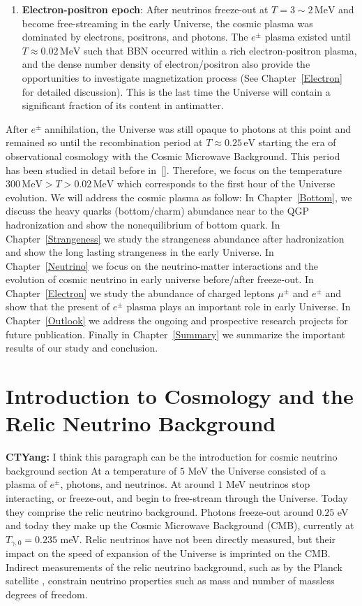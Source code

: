 \begin{enumerate}
    \item \textbf{Electron-positron epoch}: After neutrinos freeze-out at $T=3\sim2\,\mathrm{MeV}$ and become free-streaming in the early Universe, the cosmic plasma was dominated by electrons, positrons, and photons. The $e^\pm$ plasma existed until $T\approx0.02\,\mathrm{MeV}$ such that BBN occurred within a rich electron-positron plasma, and the dense number density of electron/positron also provide the opportunities to investigate magnetization process (See Chapter~\ref{Electron} for detailed discussion). This is the last time the Universe will contain a significant fraction of its content in antimatter.
\end{enumerate}
After $e^\pm$ annihilation, the Universe was still opaque to photons at this point and remained so until the recombination period at $T\approx0.25\,\mathrm{eV}$ starting the era of observational cosmology with the Cosmic Microwave Background. This period has been studied in detail before in~[\cite{Planck:2018vyg}]. Therefore, we focus on the temperature $300\,\mathrm{MeV}>T>0.02\,\mathrm{MeV}$ which corresponds to the first hour of the Universe evolution. We will address the cosmic plasma as follow: In Chapter~\ref{Bottom}, we discuss the heavy quarks (bottom/charm) abundance near to the QGP hadronization and show the nonequilibrium of bottom quark.  In Chapter~\ref{Strangeness} we study the strangeness abundance after hadronization and show the long lasting strangeness in the early Universe. In Chapter~\ref{Neutrino} we focus on the neutrino-matter interactions and the evolution of cosmic neutrino in early universe before/after freeze-out. In Chapter~\ref{Electron} we study the abundance of charged leptons $\mu^\pm$ and $e^\pm$ and show that the present of $e^\pm$ plasma plays an important role in early Universe. In Chapter~\ref{Outlook} we address the ongoing and prospective research projects for future publication.
Finally in Chapter~\ref{Summary} we summarize the important results of our study and conclusion.

\section{Introduction to Cosmology and the Relic Neutrino Background}\label{ch:intro}
{\color{blue}\textbf{CTYang:} I think this paragraph can be the introduction for cosmic neutrino background section}
At a temperature of $5$ MeV the Universe consisted of a plasma of $e^\pm$, photons, and neutrinos. At around $1$ MeV neutrinos stop interacting, or freeze-out, and begin to free-stream through the Universe. Today they comprise the relic neutrino background. Photons freeze-out around $0.25$ eV and today they make up the Cosmic Microwave Background (CMB), currently at $T_{\gamma,0}=0.235$ meV.  Relic neutrinos have not been directly measured, but their impact on the speed of expansion of the Universe is imprinted on the CMB.  Indirect measurements of the relic neutrino background, such as by the Planck satellite \cite{Planck},  constrain neutrino properties such as mass and number of massless degrees of freedom.

